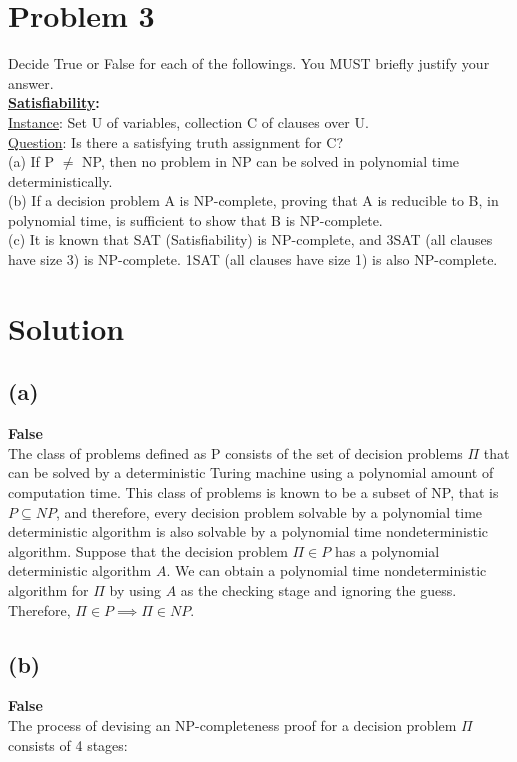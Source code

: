 
\section*{Problem 3}
	Decide True or False for each of the followings. You MUST briefly justify your answer.\\
	
	\noindent
	\textbf{\underline{Satisfiability}:}\\
	\underline{Instance}: Set U of variables, collection C of clauses over U.\\
	\underline{Question}: Is there a satisfying truth assignment for C?\\
	
	\noindent
	(a) If P $\neq$ NP, then no problem in NP can be solved in polynomial time deterministically.\\
	(b) If a decision problem A is NP-complete, proving that A is reducible to B, in polynomial time, is sufficient to show that B is NP-complete.\\
	(c) It is known that SAT (Satisfiability) is NP-complete, and 3SAT (all clauses have size 3) is NP-complete. 1SAT (all clauses have size 1) is also NP-complete.
	
\section*{Solution}
	\subsection*{(a)}
		\textbf{False}\\
		The class of problems defined as P consists of the set of decision problems $\Pi$ that can be solved by a deterministic Turing machine using a polynomial amount of computation time. This class of problems is known to be a subset of NP, that is $P\subseteq NP$, and therefore, every decision problem solvable by a polynomial time deterministic algorithm is also solvable by a  polynomial time nondeterministic algorithm. Suppose that the decision problem $\Pi \in P$ has a polynomial deterministic algorithm $A$. We can obtain a polynomial time nondeterministic algorithm for $\Pi$ by using $A$ as the checking stage and ignoring the guess. Therefore, $\Pi \in P \implies \Pi \in NP$.
		
	\subsection*{(b)}
		\textbf{False}\\
		The process of devising an NP-completeness proof for a decision problem $\Pi$ consists of 4 stages:\\
		
